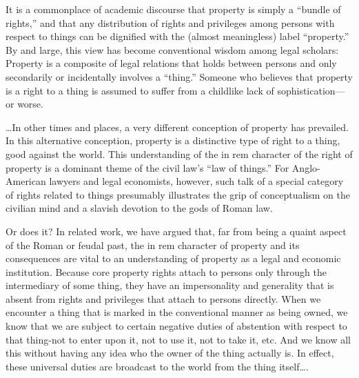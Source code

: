 
It is a commonplace of academic discourse that property is simply a ``bundle of
rights,'' and that any distribution of rights and privileges among persons with
respect to things can be dignified with the (almost meaningless) label
``property.'' By and large, this view has become conventional wisdom
among legal scholars: Property is a composite of legal relations that holds
between persons and only secondarily or incidentally involves a ``thing.''
Someone who believes that property is a right to a thing is assumed to suffer
from a childlike lack of sophistication---or worse. 

\ldots In other times and places, a very different conception of property has
prevailed. In this alternative conception, property is a distinctive type of
right to a thing, good against the world. This understanding of the in rem
character of the right of property is a dominant theme of the civil law's ``law
of things.'' For Anglo-American lawyers and legal economists, however, such
talk of a special category of rights related to things presumably illustrates
the grip of conceptualism on the civilian mind and a slavish devotion to the
gods of Roman law.

Or does it? In related work, we have argued that, far from being a quaint aspect
of the Roman or feudal past, the in rem character of property and its
consequences are vital to an understanding of property as a legal and economic
institution. Because core property rights attach to persons
only through the intermediary of some thing, they have an impersonality and
generality that is absent from rights and privileges that attach to persons
directly. When we encounter a thing that is marked in the conventional manner
as being owned, we know that we are subject to certain negative duties of
abstention with respect to that thing-not to enter upon it, not to use it, not
to take it, etc. And we know all this without having any idea who the owner of
the thing actually is. In effect, these universal duties are broadcast to the
world from the thing itself\ldots.

